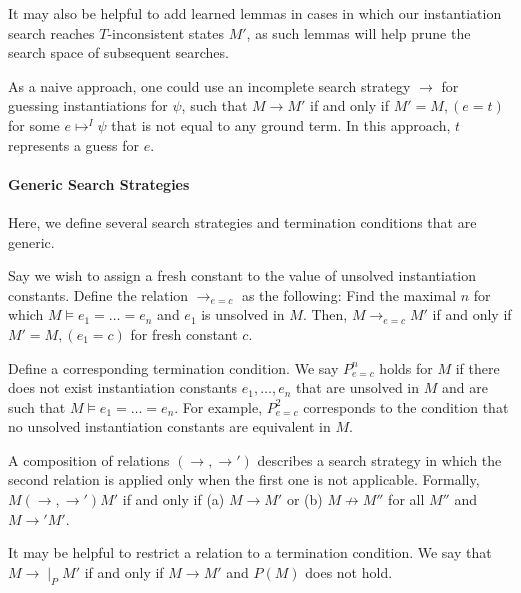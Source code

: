 \documentclass{llncs}
\begin{document}
It may also be helpful to add learned lemmas in cases in which our instantiation search reaches $T$-inconsistent states $M'$, as such lemmas will help prune the search space of subsequent searches.

As a naive approach, one could use an incomplete search strategy $\rightarrow$ for guessing instantiations for $\psi$, such that $M \rightarrow M'$ if and only if $M' = M, (e = t)$ for some $e \mapsto^I \psi$ that is not equal to any ground term.
In this approach, $t$ represents a guess for $e$.


\paragraph{Generic Search Strategies}

Here, we define several search strategies and termination conditions that are generic.

Say we wish to assign a fresh constant to the value of unsolved instantiation constants.
Define the relation $\rightarrow_{e=c}$ as the following: 
Find the maximal $n$ for which $M \models e_1 = \ldots = e_n$ and $e_1$ is unsolved in $M$.  
Then, $M \rightarrow_{e=c} M'$ if and only if $M' = M, (e_1 = c)$ for fresh constant $c$.

Define a corresponding termination condition.
We say $P^n_{e=c}$ holds for $M$ if there does not exist instantiation constants $e_1, \ldots, e_n$ that are unsolved in $M$ and are such that $M \models e_1 = \ldots = e_n$.  
For example, $P^2_{e=c}$ corresponds to the condition that no unsolved instantiation constants are equivalent in $M$.

A composition of relations $(\rightarrow, \rightarrow')$ describes a search strategy in which the second relation is applied only when the first one is not applicable.
Formally, $M (\rightarrow, \rightarrow') M'$ if and only if (a) $M \rightarrow M'$ or (b) $M \not\rightarrow M''$ for all $M''$ and $M \rightarrow' M'$.

It may be helpful to restrict a relation to a termination condition.
We say that $M \rightarrow \mid_P M'$ if and only if $M \rightarrow M'$ and $P( M )$ does not hold.
\end{document}
